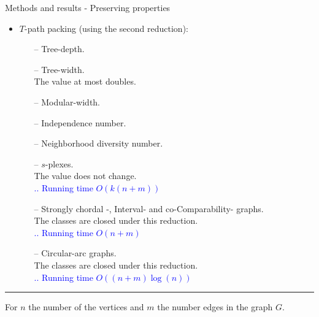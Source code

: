 \documentclass{beamer}
\begin{document}
\begin{frame}[t]{Methods and results - Preserving properties}
\vspace{.5cm}
	\begin{itemize}
		\item $T$-path packing (using the second reduction):
		\begin{itemize}
			\item[--] Tree-depth.
			\item[--] Tree-width.\\ \hspace{.5cm} The value at most doubles.
			\item[--] Modular-width.
			\item[--] Independence number.
			\item[--] Neighborhood diversity number.
			\item[--] $s$-plexes.\\ \hspace{.5cm} The value does not change.\\
				\hspace{5cm} \textcolor{blue}{ .. Running time $O(k(n+m))$}
			\item[--] Strongly chordal -, Interval- and co-Comparability- graphs.\\
				\hspace{.5cm} The classes are closed under this reduction.\\
				\hspace{5cm} \textcolor{blue}{ .. Running time $O(n+m)$}
			\item[--] Circular-arc graphs.\\
				\hspace{.5cm} The classes are closed under this reduction.\\
				\hspace{5cm} \textcolor{blue}{ .. Running time $O((n+m)\log(n))$}
		\end{itemize}
	\end{itemize}
	\hrule
	{\tiny For $n$ the number of the vertices and $m$ the number edges in the graph $G$.}
\end{frame}
\end{document}
